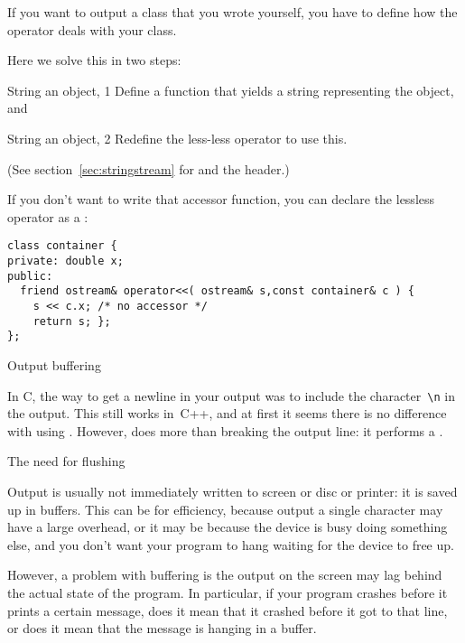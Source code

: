   If you want to output a class that you wrote yourself, you have to
  define how the \n{<<} operator deals with your class.

Here we solve this in two steps:

\begin{block}{String an object, 1}
  \label{sl:class-cout1}
 Define a function that yields a string representing the object, and 

\end{block}

\begin{block}{String an object, 2}
  \label{sl:class-cout2}
  Redefine the less-less operator to use this.

\end{block}

(See section~\ref{sec:stringstream} for  and the
 header.)


If you don't want to write that accessor function, you can declare
the lessless operator as a :
\begin{lstlisting}
class container {
private: double x;
public:
  friend ostream& operator<<( ostream& s,const container& c ) {
    s << c.x; /* no accessor */
    return s; };
};
\end{lstlisting}

 {Output buffering}
\label{sec:to-endl-or-not}

In C, the way to get a newline in your output was to include the
character~\verb+\n+ in the output. This still works in~C++, and at
first it seems there is no difference with using . However,
 does more than breaking the output line: it
performs a .

 {The need for flushing}

Output is usually not immediately written to screen or disc or
printer: it is saved up in buffers. This can be for efficiency,
because output a single character may have a large overhead, or it may
be because the device is busy doing something else, and you don't want
your program to hang waiting for the device to free up.

However, a problem with buffering is the output on the screen may lag
behind the actual state of the program. In particular, if your program
crashes before it prints a certain message, does it mean that it
crashed before it got to that line, or does it mean that the message
is hanging in a buffer.

